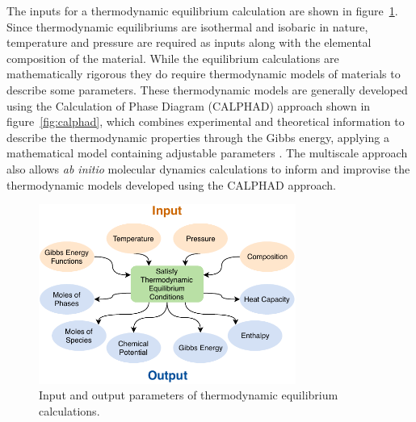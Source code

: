 	The inputs for a thermodynamic equilibrium calculation are shown in figure~\ref{fig:Thermod}. Since thermodynamic equilibriums are isothermal and isobaric in nature, temperature and pressure are required as inputs along with the elemental composition of the material. While the equilibrium calculations are mathematically rigorous they do require thermodynamic models of materials to describe some parameters.  These thermodynamic models are generally developed using the Calculation of Phase Diagram (CALPHAD) approach shown in figure~\ref{fig:calphad}, which combines experimental and theoretical information to describe the thermodynamic properties through the Gibbs energy, applying a mathematical model containing adjustable parameters \cite{Lukas07}.  The multiscale approach also allows \textit{ab initio} molecular dynamics calculations to inform and improvise the thermodynamic models developed using the CALPHAD approach.
	\begin{figure}
        		\centering
        		\includegraphics[width=0.75\textwidth]{figures/Thermodynamics.pdf}
        		\caption{Input and output parameters of thermodynamic equilibrium calculations.}
        		\label{fig:Thermod}
    	\end{figure}

